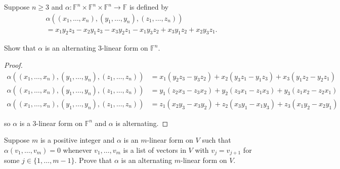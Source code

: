 \begin{exercise}\label{chapter9:sectionB:exercise2}
    Suppose $n\geq 3$ and $\alpha: \mathbb{F}^{n}\times\mathbb{F}^{n}\times\mathbb{F}^{n} \to \mathbb{F}$ is defined by
    \begin{gather*}
        \alpha((x_{1}, \ldots, x_{n}), (y_{1}, \ldots, y_{n}), (z_{1}, \ldots, z_{n})) \\
        = x_{1}y_{2}z_{3} - x_{2}y_{1}z_{3} - x_{3}y_{2}z_{1} - x_{1}y_{3}z_{2} + x_{3}y_{1}z_{2} + x_{2}y_{3}z_{1}.
    \end{gather*}

    Show that $\alpha$ is an alternating $3$-linear form on $\mathbb{F}^{n}$.
\end{exercise}

\begin{proof}
    \begin{align*}
        \alpha((x_{1}, \ldots, x_{n}), (y_{1}, \ldots, y_{n}), (z_{1}, \ldots, z_{n})) & = x_{1}(y_{2}z_{3} - y_{3}z_{2}) + x_{2}(y_{3}z_{1} - y_{1}z_{3}) + x_{3}(y_{1}z_{2} - y_{2}z_{1}) \\
        \alpha((x_{1}, \ldots, x_{n}), (y_{1}, \ldots, y_{n}), (z_{1}, \ldots, z_{n})) & = y_{1}(z_{2}x_{3} - z_{3}x_{2}) + y_{2}(z_{3}x_{1} - z_{1}x_{3}) + y_{3}(z_{1}x_{2} - z_{2}x_{1}) \\
        \alpha((x_{1}, \ldots, x_{n}), (y_{1}, \ldots, y_{n}), (z_{1}, \ldots, z_{n})) & = z_{1}(x_{2}y_{3} - x_{3}y_{2}) + z_{2}(x_{3}y_{1} - x_{1}y_{3}) + z_{3}(x_{1}y_{2} - x_{2}y_{1})
    \end{align*}

    so $\alpha$ is a $3$-linear form on $\mathbb{F}^{n}$ and $\alpha$ is alternating.
\end{proof}
\newpage

\begin{exercise}\label{chapter9:sectionB:exercise3}
    Suppose $m$ is a positive integer and $\alpha$ is an $m$-linear form on $V$ such that $\alpha(v_{1}, \ldots, v_{m}) = 0$ whenever $v_{1}, \ldots, v_{m}$ is a list of vectors in $V$ with $v_{j} = v_{j+1}$ for some $j\in\{1,\ldots,m-1\}$. Prove that $\alpha$ is an alternating $m$-linear form on $V$.
\end{exercise}


